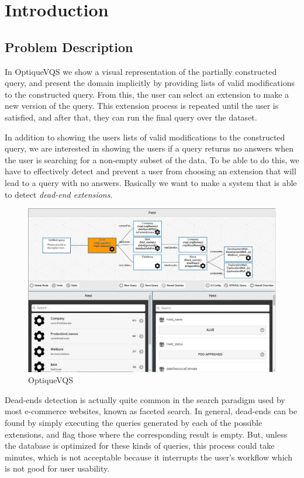 \documentclass[a4paper,english]{ifimaster/ifimaster}
\begin{document}
\listoffigures{}
\listoftables{}


\mainmatter{}
\chapter{Introduction}

\section{Problem Description} \label{Problem description}

In OptiqueVQS we show a visual representation of the partially constructed query, and present the domain implicitly by providing lists of valid modifications to the constructed query. From this, the user can select an extension to make a new version of the query. This extension process is repeated until the user is satisfied, and after that, they can run the final query over the dataset.~\cite{vidar-phd-2020}

In addition to showing the users lists of valid modifications to the constructed query, we are interested in showing the users if a query returns no answers when the user is searching for a non-empty subset of the data. To be able to do this, we have to effectively detect and prevent a user from choosing an extension that will lead to a query with no answers. Basically we want to make a system that is able to detect \textit{dead-end extensions}. 

\begin{figure}[htp]
    \centering
    \includegraphics[width=12cm]{images/optiqueVQS.PNG}
    \caption{OptiqueVQS}
    \label{fig:optiqueVQS}
\end{figure}

Dead-ends detection is actually quite common in the search paradigm used by most e-commerce websites, known as faceted search. In general, dead-ends can be found by simply executing the queries generated by each of the possible extensions, and flag those where the corresponding result is empty. But, unless the database is optimized for these kinds of queries, this process could take minutes, which is not acceptable because it interrupts the user’s workflow which is not good for user usability.~\cite{vidar-phd-2020} 
\end{document}
